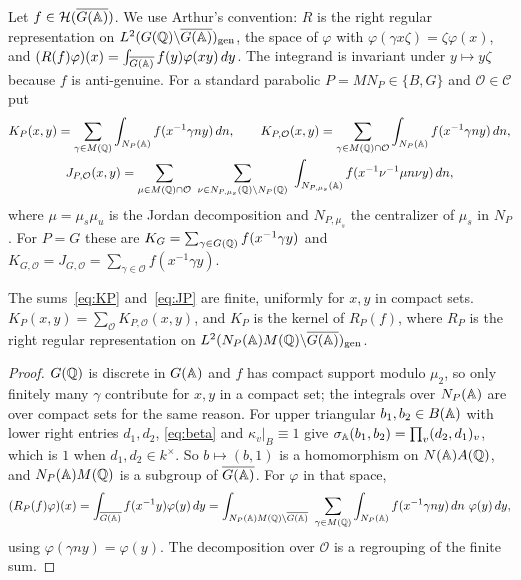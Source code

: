 Let $f\in\mathcal H(\overline{G(\mathbb{A})})$. We use Arthur's convention: $R$ is the right
regular representation on $L^2(G(\mathbb{Q})\backslash\overline{G(\mathbb{A})})_{\mathrm{gen}}$, the
space of $\varphi$ with $\varphi(\gamma x\zeta)=\zeta\varphi(x)$, and
$(R(f)\varphi)(x)=\int_{\overline{G(\mathbb{A})}}f(y)\varphi(xy)\,dy$. The integrand is
invariant under $y\mapsto y\zeta$ because $f$ is anti-genuine. For a
standard parabolic $P=MN_P\in\{B,G\}$ and $\mathcal O\in\mathcal C$ put
\begin{gather}
K_P(x,y)=\sum_{\gamma\in M(\mathbb{Q})}\int_{N_P(\mathbb{A})}f(x^{-1}\gamma ny)\,dn,
\qquad
K_{P,\mathcal O}(x,y)=\sum_{\gamma\in M(\mathbb{Q})\cap\mathcal O}
\int_{N_P(\mathbb{A})}f(x^{-1}\gamma ny)\,dn,\label{eq:KP}\\
J_{P,\mathcal O}(x,y)=\sum_{\mu\in M(\mathbb{Q})\cap\mathcal O}\
\sum_{\nu\in N_{P,\mu_s}(\mathbb{Q})\backslash N_P(\mathbb{Q})}\ \int_{N_{P,\mu_s}(\mathbb{A})}
f(x^{-1}\nu^{-1}\mu n\nu y)\,dn,\label{eq:JP}
\end{gather}
where $\mu=\mu_s\mu_u$ is the Jordan decomposition and $N_{P,\mu_s}$ the
centralizer of $\mu_s$ in $N_P$. For $P=G$ these are
$K_G=\sum_{\gamma\in G(\mathbb{Q})}f(x^{-1}\gamma y)$ and
$K_{G,\mathcal O}=J_{G,\mathcal O}=\sum_{\gamma\in\mathcal O}
f(x^{-1}\gamma y)$.

\begin{lemma}\label{lem:kernels}
The sums~\eqref{eq:KP} and~\eqref{eq:JP} are finite, uniformly for $x,y$
in compact sets. $K_P(x,y)=\sum_{\mathcal O}K_{P,\mathcal O}(x,y)$, and
$K_P$ is the kernel of $R_P(f)$, where $R_P$ is the right regular
representation on $L^2(N_P(\mathbb{A})M(\mathbb{Q})\backslash\overline{G(\mathbb{A})})_{\mathrm{gen}}$.
\end{lemma}

\begin{proof}
$G(\mathbb{Q})$ is discrete in $G(\mathbb{A})$ and $f$ has compact support modulo
$\mu_2$, so only finitely many $\gamma$ contribute for $x,y$ in a compact
set; the integrals over $N_P(\mathbb{A})$ are over compact sets for the same
reason. For upper triangular $b_1,b_2\in B(\mathbb{A})$ with lower right entries
$d_1,d_2$, \eqref{eq:beta} and $\kappa_v|_B\equiv1$ give
$\sigma_{\mathbb{A}}(b_1,b_2)=\prod_v(d_2,d_1)_v$, which is $1$ when
$d_1,d_2\in k^\times$. So $b\mapsto(b,1)$ is a homomorphism on
$N(\mathbb{A})A(\mathbb{Q})$, and $N_P(\mathbb{A})M(\mathbb{Q})$ is a subgroup of $\overline{G(\mathbb{A})}$. For
$\varphi$ in that space,
\[
(R_P(f)\varphi)(x)=\int_{\overline{G(\mathbb{A})}}f(x^{-1}y)\varphi(y)\,dy
=\int_{N_P(\mathbb{A})M(\mathbb{Q})\backslash\overline{G(\mathbb{A})}}\ \sum_{\gamma\in M(\mathbb{Q})}
\int_{N_P(\mathbb{A})}f(x^{-1}\gamma ny)\,dn\ \varphi(y)\,dy,
\]
using $\varphi(\gamma ny)=\varphi(y)$. The decomposition over
$\mathcal O$ is a regrouping of the finite sum.
\end{proof}

